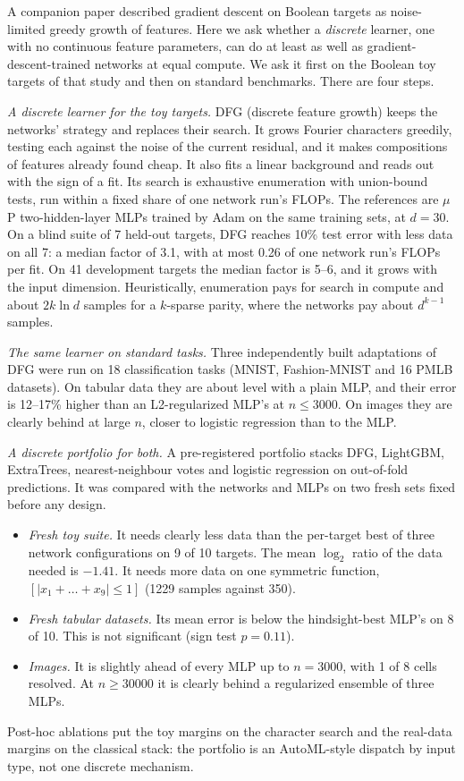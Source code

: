 \noindent
A companion paper described gradient descent on Boolean targets as noise-limited greedy growth of features. Here we ask whether a \emph{discrete} learner, one with no continuous feature parameters, can do at least as well as gradient-descent-trained networks at equal compute. We ask it first on the Boolean toy targets of that study and then on standard benchmarks. There are four steps.

\emph{A discrete learner for the toy targets.} DFG (discrete feature growth) keeps the networks' strategy and replaces their search. It grows Fourier characters greedily, testing each against the noise of the current residual, and it makes compositions of features already found cheap. It also fits a linear background and reads out with the sign of a fit. Its search is exhaustive enumeration with union-bound tests, run within a fixed share of one network run's FLOPs. The references are $\mu$P two-hidden-layer MLPs trained by Adam on the same training sets, at $d=30$. On a blind suite of 7 held-out targets, DFG reaches 10\% test error with less data on all 7: a median factor of 3.1, with at most 0.26 of one network run's FLOPs per fit. On 41 development targets the median factor is 5--6, and it grows with the input dimension. Heuristically, enumeration pays for search in compute and about $2k\ln d$ samples for a $k$-sparse parity, where the networks pay about $d^{k-1}$ samples.

\emph{The same learner on standard tasks.} Three independently built adaptations of DFG were run on 18 classification tasks (MNIST, Fashion-MNIST and 16 PMLB datasets). On tabular data they are about level with a plain MLP, and their error is 12--17\% higher than an L2-regularized MLP's at $n\le3000$. On images they are clearly behind at large $n$, closer to logistic regression than to the MLP.

\emph{A discrete portfolio for both.} A pre-registered portfolio stacks DFG, LightGBM, ExtraTrees, nearest-neighbour votes and logistic regression on out-of-fold predictions. It was compared with the networks and MLPs on two fresh sets fixed before any design.
\begin{itemize}
\item \emph{Fresh toy suite.} It needs clearly less data than the per-target best of three network configurations on 9 of 10 targets. The mean $\log_2$ ratio of the data needed is $-1.41$. It needs more data on one symmetric function, $[|x_1+\dots+x_9|\le1]$ (1229 samples against 350).
\item \emph{Fresh tabular datasets.} Its mean error is below the hindsight-best MLP's on 8 of 10. This is not significant (sign test $p=0.11$).
\item \emph{Images.} It is slightly ahead of every MLP up to $n=3000$, with 1 of 8 cells resolved. At $n\ge30000$ it is clearly behind a regularized ensemble of three MLPs.
\end{itemize}
Post-hoc ablations put the toy margins on the character search and the real-data margins on the classical stack: the portfolio is an AutoML-style dispatch by input type, not one discrete mechanism.

